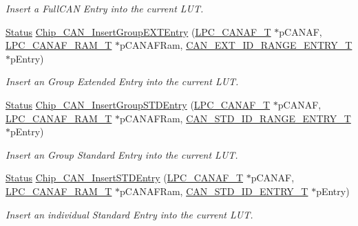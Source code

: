 \begin{DoxyCompactItemize}
\begin{DoxyCompactList}\small\item\em Insert a Full\+C\+AN Entry into the current L\+UT. \end{DoxyCompactList}\item 
\hyperlink{group__LPC__Types__Public__Types_ga67a0db04d321a74b7e7fcfd3f1a3f70b}{Status} \hyperlink{group__CAN__17XX__40XX_ga6bb7c9685df871a1d6dae14908c70397}{Chip\+\_\+\+C\+A\+N\+\_\+\+Insert\+Group\+E\+X\+T\+Entry} (\hyperlink{structLPC__CANAF__T}{L\+P\+C\+\_\+\+C\+A\+N\+A\+F\+\_\+T} $\ast$p\+C\+A\+N\+AF, \hyperlink{structLPC__CANAF__RAM__T}{L\+P\+C\+\_\+\+C\+A\+N\+A\+F\+\_\+\+R\+A\+M\+\_\+T} $\ast$p\+C\+A\+N\+A\+F\+Ram, \hyperlink{structCAN__EXT__ID__RANGE__ENTRY__T}{C\+A\+N\+\_\+\+E\+X\+T\+\_\+\+I\+D\+\_\+\+R\+A\+N\+G\+E\+\_\+\+E\+N\+T\+R\+Y\+\_\+T} $\ast$p\+Entry)
\begin{DoxyCompactList}\small\item\em Insert an Group Extended Entry into the current L\+UT. \end{DoxyCompactList}\item 
\hyperlink{group__LPC__Types__Public__Types_ga67a0db04d321a74b7e7fcfd3f1a3f70b}{Status} \hyperlink{group__CAN__17XX__40XX_gaf418fa9333574ccb4e710982f90b650c}{Chip\+\_\+\+C\+A\+N\+\_\+\+Insert\+Group\+S\+T\+D\+Entry} (\hyperlink{structLPC__CANAF__T}{L\+P\+C\+\_\+\+C\+A\+N\+A\+F\+\_\+T} $\ast$p\+C\+A\+N\+AF, \hyperlink{structLPC__CANAF__RAM__T}{L\+P\+C\+\_\+\+C\+A\+N\+A\+F\+\_\+\+R\+A\+M\+\_\+T} $\ast$p\+C\+A\+N\+A\+F\+Ram, \hyperlink{structCAN__STD__ID__RANGE__ENTRY__T}{C\+A\+N\+\_\+\+S\+T\+D\+\_\+\+I\+D\+\_\+\+R\+A\+N\+G\+E\+\_\+\+E\+N\+T\+R\+Y\+\_\+T} $\ast$p\+Entry)
\begin{DoxyCompactList}\small\item\em Insert an Group Standard Entry into the current L\+UT. \end{DoxyCompactList}\item 
\hyperlink{group__LPC__Types__Public__Types_ga67a0db04d321a74b7e7fcfd3f1a3f70b}{Status} \hyperlink{group__CAN__17XX__40XX_ga164daa2297bee23837a93bbea3793531}{Chip\+\_\+\+C\+A\+N\+\_\+\+Insert\+S\+T\+D\+Entry} (\hyperlink{structLPC__CANAF__T}{L\+P\+C\+\_\+\+C\+A\+N\+A\+F\+\_\+T} $\ast$p\+C\+A\+N\+AF, \hyperlink{structLPC__CANAF__RAM__T}{L\+P\+C\+\_\+\+C\+A\+N\+A\+F\+\_\+\+R\+A\+M\+\_\+T} $\ast$p\+C\+A\+N\+A\+F\+Ram, \hyperlink{structCAN__STD__ID__ENTRY__T}{C\+A\+N\+\_\+\+S\+T\+D\+\_\+\+I\+D\+\_\+\+E\+N\+T\+R\+Y\+\_\+T} $\ast$p\+Entry)
\begin{DoxyCompactList}\small\item\em Insert an individual Standard Entry into the current L\+UT. \end{DoxyCompactList}\item 

\end{DoxyCompactItemize}
